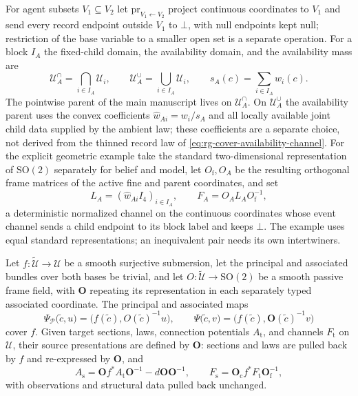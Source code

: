 For agent subsets \(V_1\subseteq V_2\) let \(\mathrm{pr}_{V_1\leftarrow V_2}\)
project continuous coordinates to \(V_1\) and send every record endpoint outside
\(V_1\) to \(\bot\), with null endpoints kept null; restriction of the base
variable to a smaller open set is a separate operation. For a block \(I_A\) the
fixed-child domain, the availability domain, and the availability mass are
\begin{equation}
 \mathcal U_A^{\cap}=\bigcap_{i\in I_A}\mathcal U_i,\qquad
 \mathcal U_A^{\cup}=\bigcup_{i\in I_A}\mathcal U_i,
 \qquad s_A(c)=\sum_{i\in I_A}w_i(c).
\label{eq:rg-cover-parent-domains}
\end{equation}
The pointwise parent of the main manuscript lives on \(\mathcal U_A^{\cap}\). On
\(\mathcal U_A^{\cup}\) the availability parent uses the convex coefficients
\(\widehat w_{Ai}=w_i/s_A\) and all locally available joint child data supplied by
the ambient law; these coefficients are a separate choice, not derived from the
thinned record law of \eqref{eq:rg-cover-availability-channel}. For the explicit
geometric example take the standard two-dimensional representation of
\(\mathrm{SO}(2)\) separately for belief and model, let \(O_{\mathrm f},O_A\) be the
resulting orthogonal frame matrices of the active fine and parent coordinates,
and set
\begin{equation}
 L_A=(\widehat w_{Ai}I_4)_{i\in I_A},\qquad
 F_A=O_AL_AO_{\mathrm f}^{-1},
\label{eq:rg-cover-parent-channel}
\end{equation}
a deterministic normalized channel on the continuous coordinates whose event
channel sends a child endpoint to its block label and keeps \(\bot\). The example
uses equal standard representations; an inequivalent pair needs its own
intertwiners.

Let \(f:\widetilde{\mathcal U}\to\mathcal U\) be a smooth surjective submersion,
let the principal and associated bundles over both bases be trivial, and let
\(O:\widetilde{\mathcal U}\to\mathrm{SO}(2)\) be a smooth passive frame field,
with \(\mathbf O\) repeating its representation in each separately typed
associated coordinate. The principal and associated maps
\begin{equation}
 \Psi_{\mathscr P}\bigl(\tilde c,u\bigr)=\bigl(f(\tilde c),O(\tilde c)^{-1}u\bigr),\qquad
 \Psi\bigl(\tilde c,v\bigr)=\bigl(f(\tilde c),\mathbf O(\tilde c)^{-1}v\bigr)
\label{eq:rg-cover-base-maps}
\end{equation}
cover \(f\). Given target sections, laws, connection potentials \(A_{\mathrm t}\),
and channels \(F_{\mathrm t}\) on \(\mathcal U\), their source presentations are
defined by \(\mathbf O\): sections and laws are pulled back by \(f\) and
re-expressed by \(\mathbf O\), and
\begin{equation}
 A_{\mathrm s}=\mathbf Of^*A_{\mathrm t}\mathbf O^{-1}-d\mathbf O\mathbf O^{-1},\qquad
 F_{\mathrm s}=\mathbf O_{\mathrm c}f^*F_{\mathrm t}\mathbf O_{\mathrm f}^{-1},
\label{eq:rg-cover-base-pullback}
\end{equation}
with observations and structural data pulled back unchanged.

